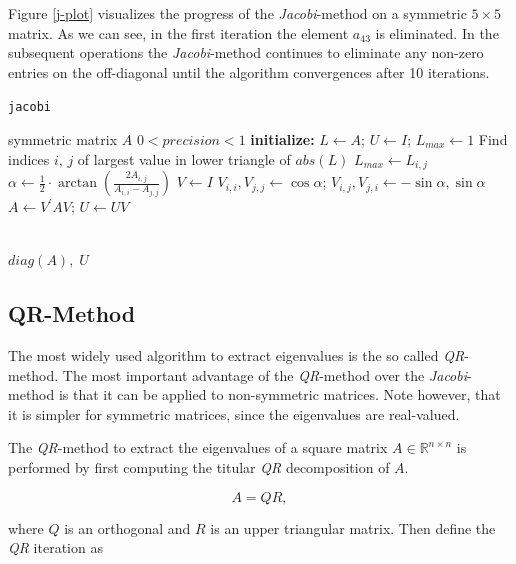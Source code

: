 \documentclass[12pt]{article}
\begin{document}
Figure \ref{j-plot} visualizes the progress of the \textit{Jacobi}-method on a symmetric $5 \times 5$ matrix. As we can see, in the first iteration the element $a_43$ is eliminated. In the subsequent operations the \textit{Jacobi}-method continues to eliminate any non-zero entries on the off-diagonal until the algorithm convergences after 10 iterations.

\begin{algorithm}
\caption{\texttt{jacobi}}
\label{j-algo}
\begin{algorithmic}[1]
  \Require symmetric matrix $A$
  \Ensure $0 < precision < 1$
  \Statex \textbf{initialize: } $L \gets A$; $U \gets I$; $L_{max} \gets 1$
    \State Find indices $i$, $j$ of largest value in lower triangle of $abs(L)$
        \State $L_{max} \gets L_{i,j}$
            \State $\alpha \gets \frac{1}{2}\cdot \arctan(\frac{2A_{i, j}}{A_{i, i}-A_{j, j}})$
    \State $V \gets I$
    \State $V_{i, i}, V_{j, j} \gets \cos \alpha$; $V_{i, j}, V_{j, i} \gets -\sin \alpha, \sin \alpha$
    \State $A \gets V^{\prime} A V$; $U \gets UV$

  \EndWhile\\
  \Return $diag(A),\; U$
\end{algorithmic}
\end{algorithm}

\subsection{QR-Method}

The most widely used algorithm to extract eigenvalues is the so called \textit{QR}-method. The most important advantage of the \textit{QR}-method over the \textit{Jacobi}-method is that it can be applied to non-symmetric matrices. Note however, that it is simpler for symmetric matrices, since the eigenvalues are real-valued.

The \textit{QR}-method to extract the eigenvalues of a square matrix $A \in \mathbb{R}^{n \times n}$ is performed by first computing the titular \textit{QR} decomposition of $A$.

\begin{equation}
\label{qr_a}
A = QR,
\end{equation}

where $Q$ is an orthogonal and $R$ is an upper triangular matrix. Then define the \textit{QR} iteration as
\end{document}
